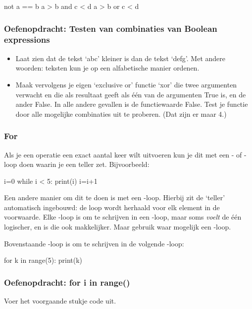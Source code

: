 \documentclass[a4paper,11pt, fleqn]{article}
\begin{document}
\begin{python}
not a == b
a > b and c < d
a > b or c < d
\end{python}

\subsubsection*{Oefenopdracht: Testen van combinaties van Boolean expressions} 
\begin{itemize}
\item Laat zien dat de tekst `abc' kleiner is dan de tekst `defg'.
Met andere woorden: teksten kun je op een alfabetische manier ordenen.
\item Maak vervolgens je eigen `exclusive or' functie `xor' die twee argumenten verwacht en die als resultaat  geeft als \'e\'en van de argumenten True is, en de ander False. In alle andere gevallen is de functiewaarde False. Test je functie door alle mogelijke combinaties uit te proberen. (Dat zijn er maar 4.)
\end{itemize}

\subsubsection{For}
Als je een operatie een exact aantal keer wilt uitvoeren kun je dit met een - of -loop doen waarin je een teller zet. Bijvoorbeeld:
\begin{python}
i=0
while i < 5:
    print(i)
    i=i+1
\end{python}
Een andere manier om dit te doen is met een -loop. Hierbij zit de `teller' automatisch ingebouwd: de loop wordt herhaald voor elk element in de voorwaarde. Elke -loop is om te schrijven in een -loop, maar soms \textit{voelt} de \'e\'en logischer, en is die ook makkelijker. Maar gebruik waar mogelijk een -loop.

Bovenstaande -loop is om te schrijven in de volgende -loop:
\begin{python}
for k in range(5):
    print(k)
\end{python}

\subsubsection*{Oefenopdracht: for i in range()}
Voer het voorgaande stukje code uit. 
\end{document}
